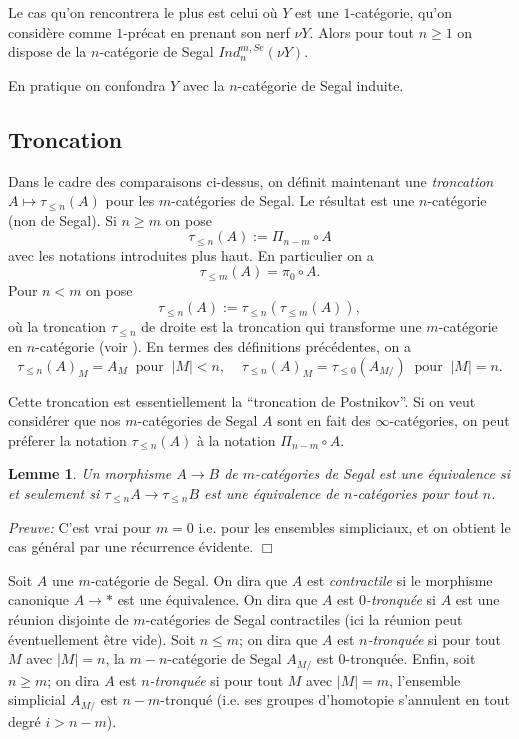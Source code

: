 \documentclass[12pt]{article}
\newcommand{\subnumero}[1]{\subsection*{#1}\phantomsection\addcontentsline{toc}{subsection}{#1}}
\newcommand{\eop}{\hfill $\Box$\vspace{.1in}}
\newtheorem{lemme}[lemma]{Lemme}
\begin{document}
Le cas qu'on rencontrera le plus est celui o\`u $Y$ est une
$1$-cat\'egorie, qu'on
consid\`ere comme $1$-pr\'ecat en prenant son nerf $\nu Y$. Alors
pour tout $n\geq 1$ on dispose de la $n$-cat\'egorie de Segal
$Ind _n^{m,Se}(\nu Y)$.

En pratique on confondra $Y$ avec la
$n$-cat\'egorie de Segal induite.



\subnumero{Troncation}

Dans le cadre des comparaisons ci-dessus,
on d\'efinit maintenant une {\em troncation} $A\mapsto \tau _{\leq n}(A)$
pour les
$m$-cat\'egories de Segal. Le r\'esultat est
une $n$-cat\'egorie (non de Segal).
Si $n\geq m$ on pose
$$
\tau _{\leq n} (A) := \Pi _{n-m} \circ A
$$
avec les notations introduites plus haut. En particulier on a
$$
\tau _{\leq m}(A)= \pi _0\circ A.
$$
Pour $n<m$ on pose
$$
\tau _{\leq n}(A):= \tau _{\leq n}(\tau _{\leq m}(A)),
$$
o\`u la troncation $\tau _{\leq n}$ de droite est la troncation
qui transforme une $m$-cat\'egorie en $n$-cat\'egorie (voir \cite{Tamsamani}).
En termes des d\'efinitions pr\'ec\'edentes, on a
$$
\tau _{\leq n}(A)_M = A_M \;\; \mbox{pour}\;\; |M|<n, \;\;\;\;
\tau _{\leq n}(A)_M = \tau _{\leq 0}(A_{M/}) \;\; \mbox{pour}\;\; |M|=n.
$$

Cette troncation est essentiellement la ``troncation de Postnikov''. Si on veut
consid\'erer que nos $m$-cat\'egories de Segal $A$ sont en fait des
$\infty$-cat\'egories, on peut pr\'eferer la notation $\tau _{\leq n}(A)$
\`a la notation $\Pi _{n-m}\circ A$.


\begin{lemme}
Un morphisme $A\rightarrow B$ de $m$-cat\'egories de Segal est une \'equivalence
si et seulement si $\tau _{\leq n}A\rightarrow \tau _{\leq n}B$ est une
\'equivalence de $n$-cat\'egories pour tout $n$.
\end{lemme}
{\em Preuve:}
C'est vrai pour $m=0$ i.e. pour les ensembles simpliciaux, et on obtient le cas
g\'en\'eral par une r\'ecurrence \'evidente.
\eop

Soit $A$ une $m$-cat\'egorie de Segal. On dira que $A$ est
{\em contractile} si le morphisme canonique $A\rightarrow \ast$ est une
\'equivalence. On dira que $A$ est {\em $0$-tronqu\'ee} si $A$ est
une r\'eunion disjointe de $m$-cat\'egories de Segal contractiles (ici la
r\'eunion peut \'eventuellement \^etre vide). Soit $n\leq m$; on dira que
$A$ est {\em $n$-tronqu\'ee} si pour tout
$M$ avec $|M| = n$, la  $m-n$-cat\'egorie de Segal $A_{M/}$ est $0$-tronqu\'ee.
Enfin, soit $n\geq m$; on dira $A$ est {\em $n$-tronqu\'ee} si pour tout
$M$ avec $|M|=m$, l'ensemble simplicial $A_{M/}$ est $n-m$-tronqu\'e (i.e. ses
groupes d'homotopie s'annulent en tout degr\'e $i>n-m$).
\end{document}
